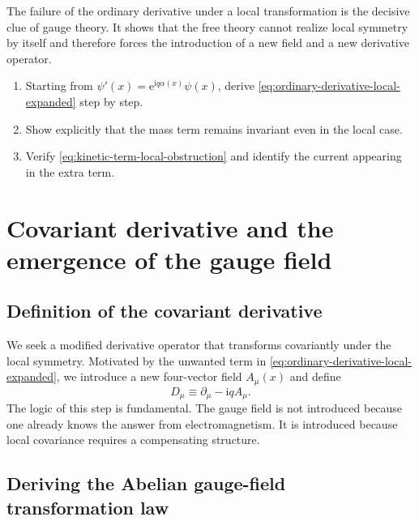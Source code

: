\documentclass[11pt,a4paper]{article}
\newcommand{\ii}{\mathrm{i}}
\newcommand{\ee}{\mathrm{e}}
\newcommand{\p}{\partial}
\begin{document}
\begin{takehomebox}
\vspace{0.25cm}
The failure of the ordinary derivative under a local transformation is the decisive clue of gauge theory. It shows that the free theory cannot realize local symmetry by itself and therefore forces the introduction of a new field and a new derivative operator.
\end{takehomebox}

\begin{guidedchecksbox}
\vspace{0.25cm}
\begin{enumerate}[leftmargin=1.6em,label=\arabic*.]
    \item Starting from \(\psi'(x)=\ee^{\ii q\alpha(x)}\psi(x)\), derive \eqref{eq:ordinary-derivative-local-expanded} step by step.
    \item Show explicitly that the mass term remains invariant even in the local case.
    \item Verify \eqref{eq:kinetic-term-local-obstruction} and identify the current appearing in the extra term.
\end{enumerate}
\end{guidedchecksbox}





\section{Covariant derivative and the emergence of the gauge field}

\subsection{Definition of the covariant derivative}

We seek a modified derivative operator that transforms covariantly under the local symmetry. Motivated by the unwanted term in \eqref{eq:ordinary-derivative-local-expanded}, we introduce a new four-vector field \(A_\mu(x)\) and define
\begin{equation}
D_\mu \equiv \p_\mu-\ii qA_\mu.
\label{eq:abelian-covariant-derivative-expanded}
\end{equation}
The logic of this step is fundamental. The gauge field is not introduced because one already knows the answer from electromagnetism. It is introduced because local covariance requires a compensating structure.

\subsection{Deriving the Abelian gauge-field transformation law}
\end{document}
